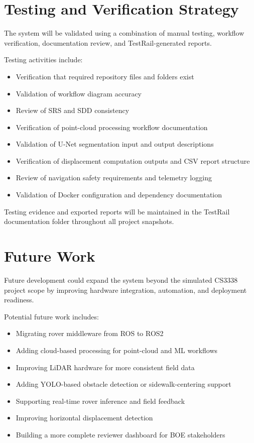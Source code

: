 \documentclass{article}
\begin{document}
\section{Testing and Verification Strategy}

The system will be validated using a combination of manual testing, workflow verification, documentation review, and TestRail-generated reports.

Testing activities include:

\begin{itemize}
    \item Verification that required repository files and folders exist
    \item Validation of workflow diagram accuracy
    \item Review of SRS and SDD consistency
    \item Verification of point-cloud processing workflow documentation
    \item Validation of U-Net segmentation input and output descriptions
    \item Verification of displacement computation outputs and CSV report structure
    \item Review of navigation safety requirements and telemetry logging
    \item Validation of Docker configuration and dependency documentation
\end{itemize}

Testing evidence and exported reports will be maintained in the TestRail documentation folder throughout all project snapshots.

\section{Future Work}

Future development could expand the system beyond the simulated CS3338 project scope by improving hardware integration, automation, and deployment readiness.

Potential future work includes:

\begin{itemize}
    \item Migrating rover middleware from ROS to ROS2
    \item Adding cloud-based processing for point-cloud and ML workflows
    \item Improving LiDAR hardware for more consistent field data
    \item Adding YOLO-based obstacle detection or sidewalk-centering support
    \item Supporting real-time rover inference and field feedback
    \item Improving horizontal displacement detection
    \item Building a more complete reviewer dashboard for BOE stakeholders
\end{itemize}
\end{document}
